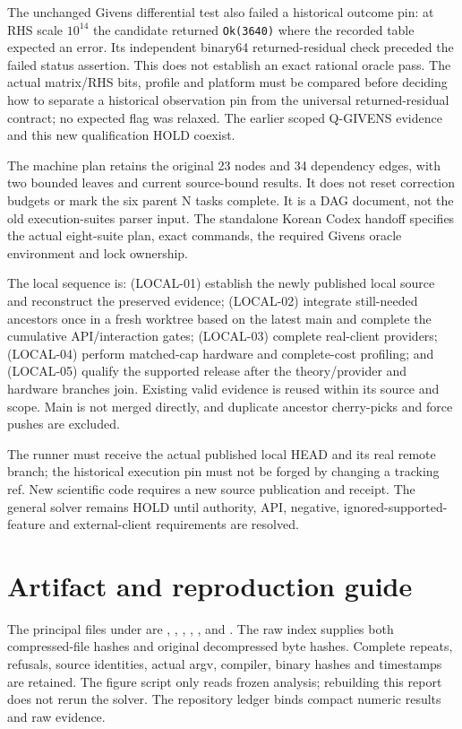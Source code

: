 \documentclass[aps,pra,reprint,onecolumn,10pt,notitlepage,nofootinbib]{revtex4-2}
\begin{document}
The unchanged Givens differential test also failed a historical outcome pin:
at RHS scale $10^{14}$ the candidate returned \texttt{Ok(3640)} where the
recorded table expected an error. Its independent binary64 returned-residual
check preceded the failed status assertion. This does not establish an exact
rational oracle pass. The actual matrix/RHS bits, profile and platform must
be compared before deciding how to separate a historical observation pin
from the universal returned-residual contract; no expected flag was relaxed.
The earlier scoped Q-GIVENS evidence and this new qualification HOLD coexist.

The machine plan retains the original 23 nodes and 34 dependency edges, with
two bounded leaves and current source-bound results. It does not reset
correction budgets or mark the six parent N tasks complete. It is a DAG
document, not the old execution-suites parser input. The standalone Korean
Codex handoff specifies the actual eight-suite plan, exact commands, the
required Givens oracle environment and lock ownership.

The local sequence is: (LOCAL-01) establish the newly published local source
and reconstruct the preserved evidence; (LOCAL-02) integrate still-needed
ancestors once in a fresh worktree based on the latest main and complete the
cumulative API/interaction gates; (LOCAL-03) complete real-client providers;
(LOCAL-04) perform matched-cap hardware and complete-cost profiling; and
(LOCAL-05) qualify the supported release after the theory/provider and
hardware branches join. Existing valid evidence is reused within its source
and scope. Main is not merged directly, and duplicate ancestor cherry-picks
and force pushes are excluded.

The runner must receive the actual published local HEAD and its real remote
branch; the historical execution pin must not be forged by changing a
tracking ref. New scientific code requires a new source publication and
receipt. The general solver remains HOLD until authority, API, negative,
ignored-supported-feature and external-client requirements are resolved.

\section*{Artifact and reproduction guide}

The principal files under 
are , ,
,
,
, and
.
The raw index supplies both compressed-file hashes and original decompressed
byte hashes. Complete repeats, refusals, source identities, actual argv,
compiler, binary hashes and timestamps are retained. The figure script only
reads frozen analysis; rebuilding this report does not rerun the solver.
The repository ledger binds compact numeric results and raw evidence.
\end{document}
